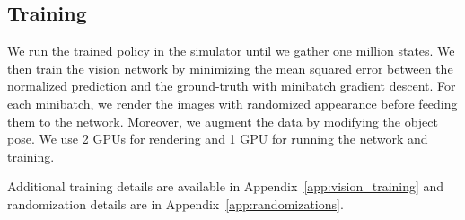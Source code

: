 \subsection{Training}


We run the trained policy in the simulator until we gather one million states.
We then train the vision network by minimizing the mean squared error between the normalized prediction and the ground-truth
with minibatch gradient descent.
For each minibatch, 
we render the images with randomized appearance before feeding them to the network.
Moreover, we augment the data by modifying the object pose.
We use 2 GPUs for rendering and 1 GPU for running the network and training.




Additional training details are available in Appendix~\ref{app:vision_training} and randomization details are in Appendix~\ref{app:randomizations}.
